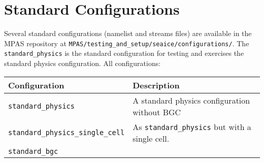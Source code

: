 \section{Standard Configurations}
\label{sec:standard_configurations}

Several standard configurations (namelist and streams files) are available in the MPAS repository at \verb+MPAS/testing_and_setup/seaice/configurations/+. The \verb+standard_physics+ is the standard configuration for testing and exercises the standard physics configuration. All configurations:

\begin{table}[H]
\begin{tabular}{ll}
\hline
Configuration & Description \\
\hline
\lstinline+standard_physics+ & A standard physics configuration without BGC \\
\lstinline+standard_physics_single_cell+ & As \lstinline+standard_physics+ but with a single cell. \\
\lstinline+standard_bgc+ &  \\
\hline
\end{tabular}
\end{table}